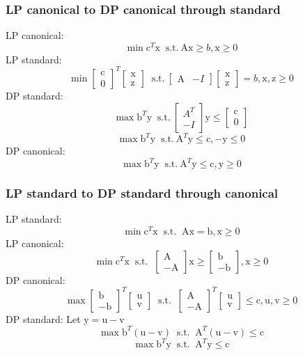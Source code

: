\documentclass[6pt]{article}
\def\x{\textrm{x}}
\def\y{\textrm{y}}
\def\z{\textrm{z}}
\def\c{\textrm{c}}
\def\b{\textrm{b}}
\def\A{\textrm{A}}
\begin{document}
\subsubsection{LP canonical to DP canonical through standard}
LP canonical:
$$\min \c^T\x ~\textrm{ s.t.}~ \A\x\geq b, \x\geq 0$$
LP standard:
$$\min \begin{bmatrix}\c\\0\end{bmatrix}^T\begin{bmatrix}\x\\\z\end{bmatrix} ~\textrm{ s.t.}~ \begin{bmatrix}\A & -I\end{bmatrix}\begin{bmatrix}\x\\\z\end{bmatrix} = b, \x, \z\geq 0$$
DP standard:
$$\max \b^T\y ~\textrm{ s.t.}~ \begin{bmatrix}A^T \\-I\end{bmatrix} \y \leq \begin{bmatrix}\c\\0\end{bmatrix}$$
$$\max \b^T\y ~\textrm{ s.t.}~ \A^T\y \leq \c, -\y\leq 0$$
DP canonical:
$$\max \b^T\y ~\textrm{ s.t.}~ \A^T\y \leq \c, \y\geq 0$$

\subsubsection{LP standard to DP standard through canonical}
LP standard:
$$\min \c^T\x ~\textrm{ s.t. }~ \A\x=\b, \x\geq 0$$
LP canonical:
$$\min \c^T\x ~\textrm{ s.t. }~ \begin{bmatrix}\A\\ -\A\end{bmatrix}\x\geq \begin{bmatrix}\b\\-\b\end{bmatrix}, \x\geq 0$$
DP canonical:
$$\max \begin{bmatrix}\b\\-\b\end{bmatrix}^T\begin{bmatrix}\textrm{u}\\\textrm{v}\end{bmatrix} ~\textrm{ s.t. }~ \begin{bmatrix}\A\\ -\A\end{bmatrix}^T\begin{bmatrix}\textrm{u}\\\textrm{v}\end{bmatrix}\leq\c, \textrm{u}, \textrm{v}\geq 0$$
DP standard: Let $\y = \textrm{u}-\textrm{v}$
$$\max \b^T(\textrm{u}-\textrm{v}) ~\textrm{ s.t. }~ \A^T(\textrm{u}-\textrm{v}) \leq \c$$
$$\max \b^T\y ~\textrm{ s.t. }~ \A^T\y \leq \c$$
\end{document}
